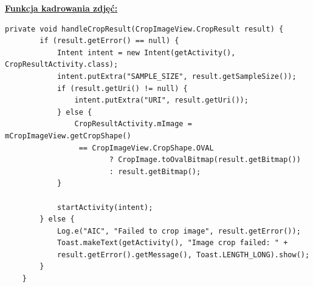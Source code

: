 \begin{center}
\underline{\textbf{Funkcja kadrowania zdjęć:}}
\end{center}
\begin{verbatim}
private void handleCropResult(CropImageView.CropResult result) {
        if (result.getError() == null) {
            Intent intent = new Intent(getActivity(), CropResultActivity.class);
            intent.putExtra("SAMPLE_SIZE", result.getSampleSize());
            if (result.getUri() != null) {
                intent.putExtra("URI", result.getUri());
            } else {
                CropResultActivity.mImage = mCropImageView.getCropShape()
                 == CropImageView.CropShape.OVAL
                        ? CropImage.toOvalBitmap(result.getBitmap())
                        : result.getBitmap();
            }

            startActivity(intent);
        } else {
            Log.e("AIC", "Failed to crop image", result.getError());
            Toast.makeText(getActivity(), "Image crop failed: " + 
            result.getError().getMessage(), Toast.LENGTH_LONG).show();
        }
    }
\end{verbatim}
